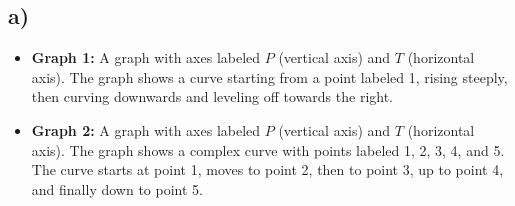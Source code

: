 

\subsection*{a)}

\begin{itemize}
    \item \textbf{Graph 1:} A graph with axes labeled $P$ (vertical axis) and $T$ (horizontal axis). The graph shows a curve starting from a point labeled 1, rising steeply, then curving downwards and leveling off towards the right.
    \item \textbf{Graph 2:} A graph with axes labeled $P$ (vertical axis) and $T$ (horizontal axis). The graph shows a complex curve with points labeled 1, 2, 3, 4, and 5. The curve starts at point 1, moves to point 2, then to point 3, up to point 4, and finally down to point 5.
\end{itemize}